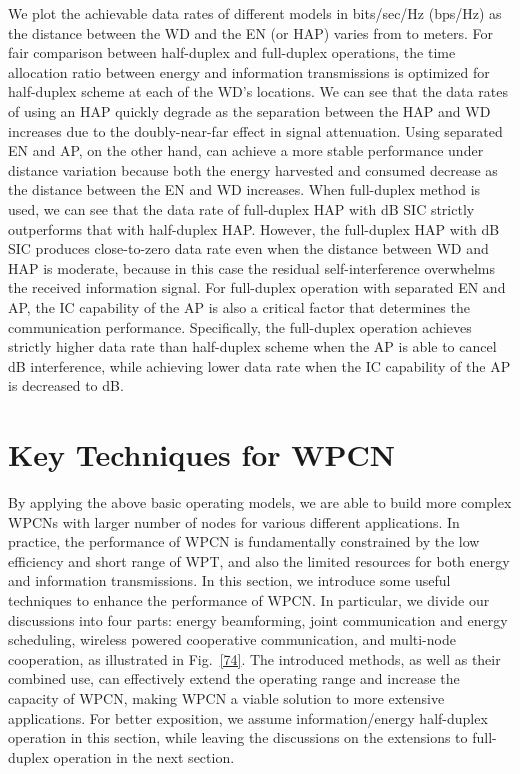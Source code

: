 \documentclass[journal, draftcls, one column, 12pt]{IEEEtran}
\begin{document}
We plot the achievable data rates of different models in bits/sec/Hz (bps/Hz) as the distance  between the WD and the EN (or HAP) varies from  to  meters. For fair comparison between half-duplex and full-duplex operations, the time allocation ratio between energy and information transmissions is optimized for half-duplex scheme at each of the WD's locations. We can see that the data rates of using an HAP quickly degrade as the separation between the HAP and WD increases due to the doubly-near-far effect in signal attenuation. Using separated EN and AP, on the other hand, can achieve a more stable performance under distance variation because both the energy harvested and consumed decrease as the distance between the EN and WD increases. When full-duplex method is used, we can see that the data rate of full-duplex HAP with  dB SIC strictly outperforms that with half-duplex HAP. However, the full-duplex HAP with  dB SIC produces close-to-zero data rate even when the distance between WD and HAP is moderate, because in this case the residual self-interference overwhelms the received information signal. For full-duplex operation with separated EN and AP, the IC capability of the AP is also a critical factor that determines the communication performance. Specifically, the full-duplex operation achieves strictly higher data rate than half-duplex scheme when the AP is able to cancel  dB interference, while achieving lower data rate when the IC capability of the AP is decreased to  dB.

\section{Key Techniques for WPCN}
By applying the above basic operating models, we are able to build more complex WPCNs with larger number of nodes for various different applications. In practice, the performance of WPCN is fundamentally constrained by the low efficiency and short range of WPT, and also the limited resources for both energy and information transmissions. In this section, we introduce some useful techniques to enhance the performance of WPCN. In particular, we divide our discussions into four parts: energy beamforming, joint communication and energy scheduling, wireless powered cooperative communication, and multi-node cooperation, as illustrated in Fig.~\ref{74}. The introduced methods, as well as their combined use, can effectively extend the operating range and increase the capacity of WPCN, making WPCN a viable solution to more extensive applications. For better exposition, we assume information/energy half-duplex operation in this section, while leaving the discussions on the extensions to full-duplex operation in the next section.
\end{document}
